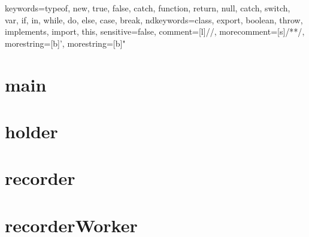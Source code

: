 {
  keywords={typeof, new, true, false, catch, function, return, null, catch, switch, var, if, in, while, do, else, case, break},
  ndkeywords={class, export, boolean, throw, implements, import, this},
  sensitive=false,
  comment=[l]{//},
  morecomment=[s]{/*}{*/},
  morestring=[b]',
  morestring=[b]"
}

	\section{main}
	
	
	\section{holder}
	
	
	\section{recorder}
	
	
	\section{recorderWorker}
	
